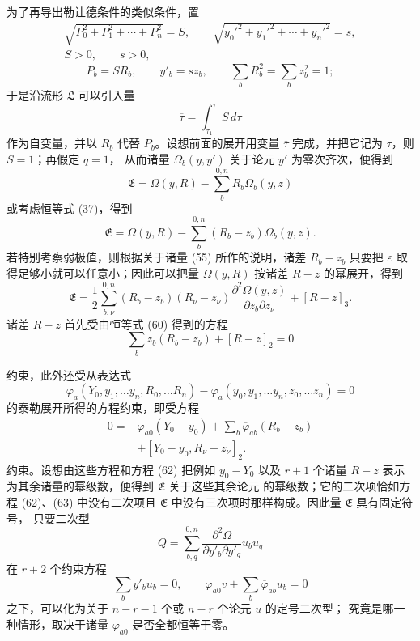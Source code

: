 \documentclass[11pt,a4paper,leqno]{article}
\begin{document}
为了再导出勒让德条件的类似条件，置
\[
\begin{gathered}
\sqrt{P_0^2+P_1^2+\cdots+P_n^2}=S,\qquad
\sqrt{y_0'^2+y_1'^2+\cdots+y_n'^2}=s,\\
S>0,\qquad s>0,
\end{gathered}
\]
\begin{equation}\tag{60}
P_b=SR_b,\qquad y'_b=sz_b,\qquad
\sum_bR_b^2=\sum_bz_b^2=1;
\end{equation}
于是沿流形 $\mathfrak{L}$ 可以引入量
\[
\overline{\tau}=\int_{\tau_1}^{\tau}S\,d\tau
\]
作为自变量，并以 $R_b$ 代替 $P_b$。设想前面的展开用变量
$\overline{\tau}$ 完成，并把它记为 $\tau$，则 $S=1$；再假定 $q=1$，
从而诸量 $\Omega_b(y,y')$ 关于论元 $y'$ 为零次齐次，便得到
\begin{equation}\tag{61}
\mathfrak{E}=\Omega(y,R)-\sum_b^{0,n}R_b\Omega_b(y,z)
\end{equation}
或考虑恒等式 (37)，得到
\[
\mathfrak{E}=\Omega(y,R)-\sum_b^{0,n}(R_b-z_b)\Omega_b(y,z).
\]
若特别考察弱极值，则根据关于诸量 (55) 所作的说明，诸差 $R_b-z_b$
只要把 $\varepsilon$ 取得足够小就可以任意小；因此可以把量
$\Omega(y,R)$ 按诸差 $R-z$ 的幂展开，得到
\[
\mathfrak{E}=\frac12\sum_{b,\nu}^{0,n}(R_b-z_b)(R_\nu-z_\nu)
\frac{\partial^2\Omega(y,z)}{\partial z_b\partial z_\nu}+[R-z]_3.
\]
诸差 $R-z$ 首先受由恒等式 (60) 得到的方程
\begin{equation}\tag{62}
\sum_b z_b(R_b-z_b)+[R-z]_2=0
\end{equation}

约束，此外还受从表达式
\[
\varphi_a(Y_0,y_1,\ldots y_n,R_0,\ldots R_n)
-\varphi_a(y_0,y_1,\ldots y_n,z_0,\ldots z_n)=0
\]
的泰勒展开所得的方程约束，即受方程
\begin{equation}\tag{63}
\begin{aligned}
0={}&\varphi_{a0}(Y_0-y_0)+\sum_b\overline{\varphi}_{ab}(R_b-z_b)\\
&+[Y_0-y_0,R_\nu-z_\nu]_2.
\end{aligned}
\end{equation}
约束。设想由这些方程和方程 (62) 把例如 $y_0-Y_0$ 以及 $r+1$ 个诸量
$R-z$ 表示为其余诸量的幂级数，便得到 $\mathfrak{E}$ 关于这些其余论元
的幂级数；它的二次项恰如方程 (62)、(63) 中没有二次项且
$\mathfrak{E}$ 中没有三次项时那样构成。因此量 $\mathfrak{E}$ 具有固定符号，
只要二次型
\[
Q=\sum_{b,q}^{0,n}
\frac{\partial^2\Omega}{\partial y'_b\partial y'_q}u_bu_q
\]
在 $r+2$ 个约束方程
\begin{equation}\tag{64}
\sum_b y'_b u_b=0,\qquad
\varphi_{a0}v+\sum_b\overline{\varphi}_{ab}u_b=0
\end{equation}
之下，可以化为关于 $n-r-1$ 个或 $n-r$ 个论元 $u$ 的定号二次型；
究竟是哪一种情形，取决于诸量
$\varphi_{a0}$ 是否全都恒等于零。
\end{document}
